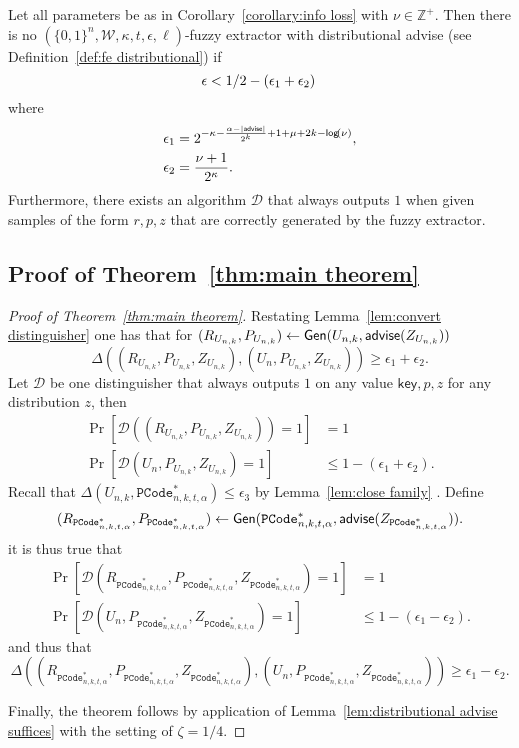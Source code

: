 \begin{lemma}
\label{lem:convert distinguisher}
Let all parameters be as in Corollary~\ref{corollary:info loss} with $\nu \in\mathbb{Z}^+$.  Then there is no $(\{0,1\}^n, \mathcal{W}, \kappa, t, \epsilon, \ell)$-fuzzy extractor with distributional advise (see Definition~\ref{def:fe distributional}) if
\[
\epsilon<1/2-\left(\epsilon_1+\epsilon_2\right)\\
\]
where 
\begin{align*}
\epsilon_1&= 2^{-\kappa-\frac{\alpha-|{\mathsf{advise}}|}{2^k}+1+\mu+2k-\mathsf{log}\!\left(\nu\right)},\\
\epsilon_2&=\frac{\nu+1}{2^{\kappa}}.
\end{align*}
Furthermore, there exists an algorithm $\mathcal{D}$ that always outputs $1$ when given samples of the form $r, p, z$ that are correctly generated by the fuzzy extractor.
\end{lemma}


\subsection{Proof of Theorem~\ref{thm:main theorem}}
\begin{proof}[Proof of Theorem~\ref{thm:main theorem}]
Restating Lemma~\ref{lem:convert distinguisher} one has that for $(R_{U_{n,k}},P_{U_{n,k}}) \leftarrow {\ensuremath{\mathsf{Gen}}}(U_{n,k}, {\mathsf{advise}}(Z_{U_{n,k}}))$
\[
\Delta((R_{U_{n,k}}, P_{U_{n,k}}, Z_{U_{n,k}}), (U_n, P_{U_{n,k}}, Z_{U_{n,k}}))\ge \epsilon_1+\epsilon_2.
\]
Let $\mathcal{D}$ be one distinguisher that always outputs $1$ on any value $\mathsf{key}, p, z$ for any distribution $z$, then
\begin{align*}
\Pr[\mathcal{D}((R_{U_{n,k}}, P_{U_{n,k}}, Z_{U_{n,k}}))=1] &=1\\
\Pr[\mathcal{D}(U_n, P_{U_{n,k}}, Z_{U_{n,k}})=1]&\le 1-(\epsilon_1+\epsilon_2).
\end{align*}
Recall that $\Delta(U_{n,k}, \mathtt{PCode}_{n, k, t, \alpha}^{*}) \le \epsilon_3$ by Lemma~\ref{lem:close family} .  Define \[(R_{\mathtt{PCode}_{n, k, t, \alpha}^{*}}, P_{\mathtt{PCode}_{n, k, t, \alpha}^{*}})\leftarrow {\ensuremath{\mathsf{Gen}}}(\mathtt{PCode}_{n, k, t, \alpha}^{*}, {\mathsf{advise}}(Z_{\mathtt{PCode}_{n, k, t, \alpha}^{*}})).\]
it is thus true that 
\begin{align*}
\Pr[\mathcal{D}(R_{\mathtt{PCode}_{n, k, t, \alpha}^{*}}, P_{\mathtt{PCode}_{n, k, t, \alpha}^{*}}, Z_{\mathtt{PCode}_{n, k, t, \alpha}^{*}})=1]&=1\\
\Pr[\mathcal{D}(U_n, P_{\mathtt{PCode}_{n, k, t, \alpha}^{*}}, Z_{\mathtt{PCode}_{n, k, t, \alpha}^{*}})=1]&\le 1-(\epsilon_1-\epsilon_2).
\end{align*}
and thus that 
\[
\Delta((R_{\mathtt{PCode}_{n, k, t, \alpha}^{*}}, P_{\mathtt{PCode}_{n, k, t, \alpha}^{*}}, Z_{\mathtt{PCode}_{n, k, t, \alpha}^{*}}), (U_n, P_{\mathtt{PCode}_{n, k, t, \alpha}^{*}}, Z_{\mathtt{PCode}_{n, k, t, \alpha}^{*}}))\ge \epsilon_1-\epsilon_2.
\]

\noindent
Finally, the theorem follows by application of Lemma~\ref{lem:distributional advise suffices} with the setting of $\zeta = 1/4$.
\end{proof} 



